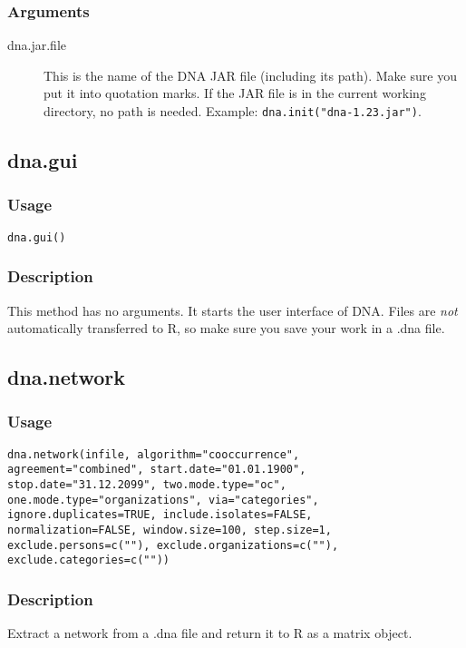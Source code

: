 \documentclass[a4paper, 10pt]{article}
\begin{document}
\subsubsection*{Arguments}
\begin{description}
 \item[dna.jar.file] This is the name of the DNA JAR file (including its path). Make sure you put it into quotation marks. If the JAR file is in the current working directory, no path is needed. Example: \verb+dna.init("dna-1.23.jar")+.
\end{description}

\subsection{dna.gui}
\subsubsection*{Usage}
\begin{verbatim}
dna.gui()
\end{verbatim}
\subsubsection*{Description}
This method has no arguments. It starts the user interface of DNA. Files are \emph{not} automatically transferred to R, so make sure you save your work in a .dna file.

\subsection{dna.network}
\subsubsection*{Usage}
\begin{verbatim}
dna.network(infile, algorithm="cooccurrence", 
agreement="combined", start.date="01.01.1900", 
stop.date="31.12.2099", two.mode.type="oc", 
one.mode.type="organizations", via="categories", 
ignore.duplicates=TRUE, include.isolates=FALSE, 
normalization=FALSE, window.size=100, step.size=1, 
exclude.persons=c(""), exclude.organizations=c(""), 
exclude.categories=c(""))
\end{verbatim}
\subsubsection*{Description}
Extract a network from a .dna file and return it to R as a matrix object.
\end{document}
